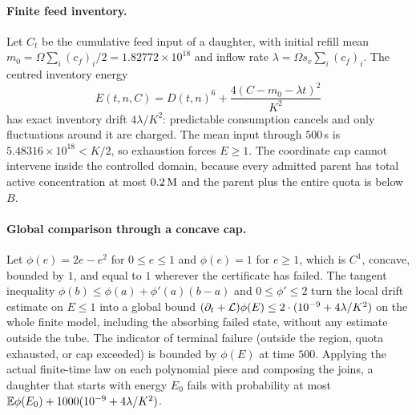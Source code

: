 \paragraph{Finite feed inventory.}
Let $C_t$ be the cumulative feed input of a daughter, with initial refill mean $m_0=\Omega\sum_i(c_f)_i/2=1.82772\times10^{18}$ and inflow rate $\lambda=\Omega s_v\sum_i(c_f)_i$. The centred inventory energy
\[
 E(t,n,C)=D(t,n)^6+\frac{4(C-m_0-\lambda t)^2}{K^2}
\]
has exact inventory drift $4\lambda/K^2$: predictable consumption cancels and only fluctuations around it are charged. The mean input through $500$\,s is $5.48316\times10^{18}<K/2$, so exhaustion forces $E\ge1$. The coordinate cap cannot intervene inside the controlled domain, because every admitted parent has total active concentration at most $0.2\,\mathrm{M}$ and the parent plus the entire quota is below $B$.

\paragraph{Global comparison through a concave cap.}
Let $\phi(e)=2e-e^2$ for $0\le e\le1$ and $\phi(e)=1$ for $e\ge1$, which is $C^1$, concave, bounded by $1$, and equal to $1$ wherever the certificate has failed. The tangent inequality $\phi(b)\le\phi(a)+\phi'(a)(b-a)$ and $0\le\phi'\le2$ turn the local drift estimate on $E\le1$ into a global bound $(\partial_t+\mathcal L)\phi(E)\le2\cdot(10^{-9}+4\lambda/K^2)$ on the whole finite model, including the absorbing failed state, without any estimate outside the tube. The indicator of terminal failure (outside the region, quota exhausted, or cap exceeded) is bounded by $\phi(E)$ at time $500$. Applying the actual finite-time law on each polynomial piece and composing the joins, a daughter that starts with energy $E_0$ fails with probability at most $\mathbb E\phi(E_0)+1000(10^{-9}+4\lambda/K^2)$.

